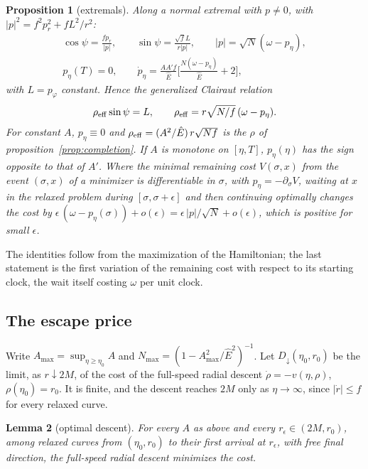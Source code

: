 \documentclass[aip,jmp,amsmath,amssymb,reprint]{revtex4-2}
\newcommand{\Ehat}{\hat E}
\theoremstyle{plain}
\newtheorem{proposition}{Proposition}[section]
\newtheorem{lemma}[proposition]{Lemma}
\theoremstyle{definition}
\begin{document}
\begin{proposition}[extremals]\label{prop:tau-pmp}
Along a normal extremal with $p\neq0$, with $|p|^2=f^2p_r^2+fL^2/r^2$:
\[
\begin{gathered}
  \cos\psi=\frac{fp_r}{|p|},\qquad \sin\psi=\frac{\sqrt fL}{r|p|},\qquad
  |p|=\sqrt N(\omega-p_\eta),\\
  p_\eta(T)=0,\qquad
  \dot p_\eta=\frac{AA'f}{\Ehat}\Big[\frac{N(\omega-p_\eta)}{\Ehat}+2\Big],
\end{gathered}
\]
with $L=p_\varphi$ constant. Hence the generalized Clairaut relation
\[
  \rho_{\rm eff}\sin\psi=L,\qquad \rho_{\rm eff}=r\sqrt{N/f}\,(\omega-p_\eta).
\]
For constant $A$, $p_\eta\equiv0$ and $\rho_{\rm eff}=(A^2/\Ehat)\,r\sqrt{Nf}$ is the $\rho$ of
proposition~\ref{prop:completion}. If $A$ is monotone on $[\eta,T]$, $p_\eta(\eta)$ has the sign
opposite to that of $A'$. Where the minimal remaining cost $V(\sigma,x)$ from the event $(\sigma,x)$ of a minimizer is
differentiable in $\sigma$, with $p_\eta=-\partial_\sigma V$, waiting at $x$ in the relaxed problem during
$[\sigma,\sigma+\epsilon]$ and then continuing optimally changes the cost by
$\epsilon\,(\omega-p_\eta(\sigma))+o(\epsilon)=\epsilon\,|p|/\sqrt N+o(\epsilon)$, which is positive for small $\epsilon$.
\end{proposition}

The identities follow from the maximization of the Hamiltonian; the last statement is the first variation of the remaining cost with respect to its starting clock, the wait
itself costing $\omega$ per unit clock.

\subsection{The escape price}
Write $A_{\max}=\sup_{\eta\ge\eta_0}A$ and $N_{\max}=(1-A_{\max}^2/\Ehat^2)^{-1}$.
Let $D_\downarrow(\eta_0,r_0)$ be the limit, as $r\downarrow2M$, of the cost of the full-speed radial
descent $\dot\rho=-v(\eta,\rho)$, $\rho(\eta_0)=r_0$. It is finite, and the descent reaches $2M$ only
as $\eta\to\infty$, since $|\dot r|\le f$ for every relaxed curve.

\begin{lemma}[optimal descent]\label{lem:descent}
For every $A$ as above and every $r_\epsilon\in(2M,r_0)$, among relaxed curves from
$(\eta_0,r_0)$ to their first arrival at $r_\epsilon$, with free final direction, the full-speed
radial descent minimizes the cost.
\end{lemma}
\end{document}

